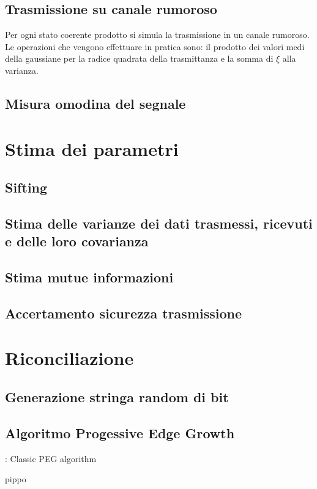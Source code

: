 \subsection{Trasmissione su canale rumoroso}
Per ogni stato coerente prodotto si simula la trasmissione in un canale rumoroso. Le operazioni che vengono effettuare in pratica sono: il prodotto dei valori medi della gaussiane per la radice quadrata della trasmittanza e la somma di $\xi$ alla varianza.
\subsection{Misura omodina del segnale}

\section{Stima dei parametri}

\subsection{Sifting}\label{subse:sifting}
\subsection{Stima delle varianze dei dati trasmessi, ricevuti e delle loro covarianza}
\subsection{Stima mutue informazioni}
\subsection{Accertamento sicurezza trasmissione}

\section{Riconciliazione}

\subsection{Generazione stringa random di bit}

\subsection{Algoritmo Progessive Edge Growth}


\begin{algorithm}
\caption{: Classic PEG algorithm}
\begin{algorithmic}
\STATE pippo 
\end{algorithmic}
\end{algorithm}


